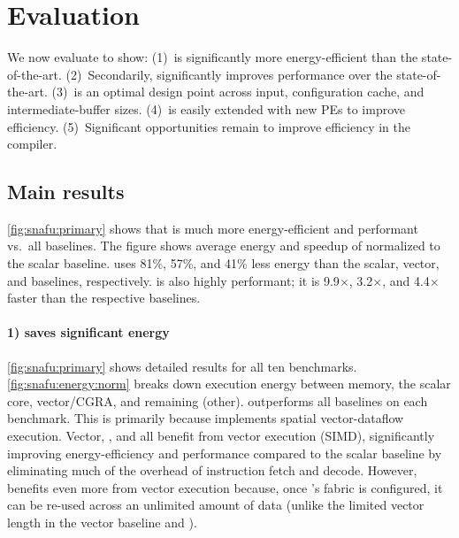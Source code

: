 \section{Evaluation}
\label{snafu:eval}

\figSNAFUPrimaryResults

We now evaluate \snafuarch to show:
(1)~\snafuarch is significantly more energy-efficient than the state-of-the-art.
(2)~Secondarily, \snafuarch significantly improves performance over the state-of-the-art.
(3)~\snafuarch is an optimal design point across input, configuration cache, and intermediate-buffer sizes.
(4)~\snafuframe is easily extended with new PEs to improve efficiency.
(5)~Significant opportunities remain to improve efficiency in the compiler.

\figSNAFUSensInputResults

\subsection{Main results}
\autoref{fig:snafu:primary} shows that \snafuarch is much more energy-efficient and performant vs.\ all baselines.
% 
The figure shows average energy and speedup of \snafuarch normalized to the scalar baseline.
% 
\snafuarch uses 81\%, 57\%, and 41\% less energy than the scalar, vector, and \manic baselines, respectively.
% 
\snafuarch is also highly performant; it is 9.9$\times$, 3.2$\times$, and 4.4$\times$ faster than the respective baselines.
% 

\paragraph{1) \snafuarch saves significant energy}
\autoref{fig:snafu:primary} shows detailed results for all ten benchmarks.
% 
\autoref{fig:snafu:energy:norm} breaks down execution energy between memory, the scalar core, vector/CGRA, and remaining (other).
% 
\snafuarch outperforms all baselines on each benchmark.
% 
This is primarily because \snafuarch implements spatial vector-dataflow execution.
%
Vector, \manic, and \snafuarch all benefit from vector execution (SIMD), significantly improving energy-efficiency and performance compared to the scalar baseline by eliminating much of the overhead of instruction fetch and decode.
%
However, \snafuarch benefits even more from vector execution
because, once \snafuarch's fabric is configured, it can be re-used across an unlimited amount of data
(unlike the limited vector length in the vector baseline and \manic).

